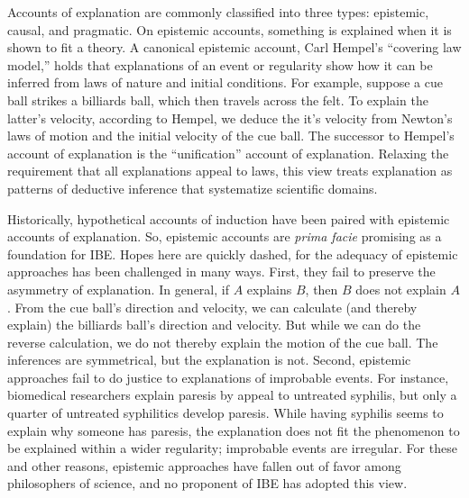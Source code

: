\documentclass{article}[11pt]
\begin{document}
Accounts of explanation are commonly classified into three types: epistemic, causal, and pragmatic.  On epistemic accounts, something is explained when it is shown to fit a theory. A canonical epistemic account, Carl Hempel's ``covering law model,'' holds that explanations of an event or regularity show how it can be inferred from laws of nature and initial conditions.  For example, suppose a cue ball strikes a billiards ball, which then travels across the felt. To explain the latter's velocity, according to Hempel, we deduce the it's velocity from Newton's laws of motion and the initial velocity of the cue ball.  The successor to Hempel's account of explanation is the ``unification'' account of explanation.  Relaxing the requirement that all explanations appeal to laws, this view treats explanation as patterns of deductive inference that systematize scientific domains.

Historically, hypothetical accounts of induction have been paired with epistemic accounts of explanation. So, epistemic accounts are \textit{prima facie} promising as a foundation for IBE.  Hopes here are quickly dashed, for the adequacy of epistemic approaches has been challenged in many ways. First, they fail to preserve the asymmetry of explanation. In general, if $A$ explains $B$, then $B$ does not explain $A$.  From the cue ball's direction and velocity, we can calculate (and thereby explain) the billiards ball's direction and velocity.  But while we can do the reverse calculation, we do not thereby explain the motion of the cue ball.  The inferences are symmetrical, but the explanation is not.  Second, epistemic approaches fail to do justice to explanations of improbable events. For instance, biomedical researchers explain paresis by appeal to untreated syphilis, but only a quarter of untreated syphilitics develop paresis.  While having syphilis seems to explain why someone has paresis, the explanation does not fit the phenomenon to be explained within a wider regularity; improbable events are irregular.  For these and other reasons, epistemic approaches have fallen out of favor among philosophers of science, and no proponent of IBE has adopted this view.
\end{document}
